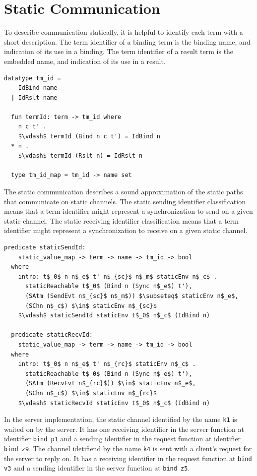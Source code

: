 \documentclass[letterpaper, 11pt]{report}
\begin{document}
\section{Static Communication}
To describe communication statically, it is helpful to identify each term with a short description.
The term identifier of a binding term is the binding name, and indication of its use in a binding.
The term identifier of a result term is the embedded name, and indication of its use in a result.

\begin{lstlisting}[language=logic, mathescape]
  datatype tm_id =
    IdBind name
  | IdRslt name 

  fun termId: term -> tm_id where
    n c t' . 
    $\vdash$ termId (Bind n c t') = IdBind n
  * n . 
    $\vdash$ termId (Rslt n) = IdRslt n

  type tm_id_map = tm_id -> name set
\end{lstlisting}

The static communication describes a sound approximation of
the static paths that communicate on static channels.
The static sending identifier classification means that a term identifier might represent a
synchronization to send on a given static channel.
The static receiving identifier classification means that a term identifier might represent a
synchronization to receive on a given static channel. 

\begin{lstlisting}[language=logic, mathescape]
  predicate staticSendId:
    static_value_map -> term -> name -> tm_id -> bool 
  where
    intro: t$_0$ n n$_e$ t' n$_{sc}$ n$_m$ staticEnv n$_c$ .
      staticReachable t$_0$ (Bind n (Sync n$_e$) t'),
      (SAtm (SendEvt n$_{sc}$ n$_m$)) $\subseteq$ staticEnv n$_e$, 
      (SChn n$_c$) $\in$ staticEnv n$_{sc}$
    $\vdash$ staticSendId staticEnv t$_0$ n$_c$ (IdBind n)

  predicate staticRecvId:
    static_value_map -> term -> name -> tm_id -> bool
  where
    intro: t$_0$ n n$_e$ t' n$_{rc}$ staticEnv n$_c$ .
      staticReachable t$_0$ (Bind n (Sync n$_e$) t'),
      (SAtm (RecvEvt n$_{rc}$)) $\in$ staticEnv n$_e$, 
      (SChn n$_c$) $\in$ staticEnv n$_{rc}$ 
    $\vdash$ staticRecvId staticEnv t$_0$ n$_c$ (IdBind n)
\end{lstlisting}


In the server implementation,
the static channel identified by the name \lstinline{k1} is waited on
by the server. It has one receiving identifier in the server function
at identifier \lstinline[language=sugar_lang]{bind p1} and a sending identifier 
in the request function at identifier \lstinline[language=sugar_lang]{bind z9}.
The channel idetifiend by the name \lstinline{k4} is sent with a client's request for
the server to reply on. It has a receiving identifier in the request function at
\lstinline[language=sugar_lang]{bind v3} and a sending identifier in the server function at
\lstinline[language=sugar_lang]{bind z5}.
\end{document}
